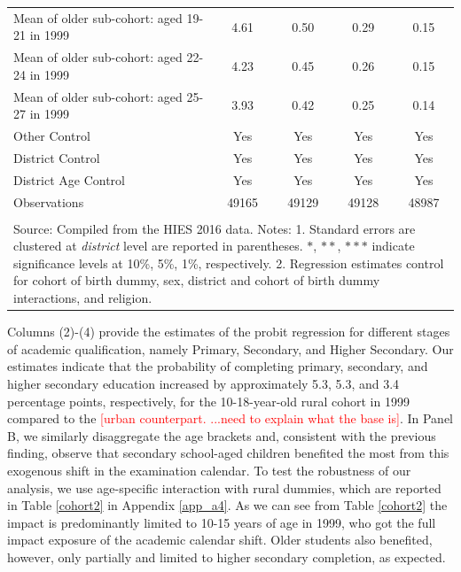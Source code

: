 \documentclass[12pt,letterpaper]{article}
\newcommand{\SAdded}[1]{\textcolor{red}{#1}}
\newcommand{\0}{\ensuremath{\mbox{\boldmath $0$}}}
\begin{document}
\begin{table}[h!]
\begin{center}
{{\begin{tabular}{lcccc}
	Mean of older sub-cohort: aged 19-21 in 1999                  &   4.61           &      0.50     &       0.29        &  0.15                         \\
	Mean of older sub-cohort: aged 22-24 in 1999                  &   4.23           &      0.45     &       0.26        &  0.15                         \\
	Mean of older sub-cohort: aged 25-27 in 1999                  &   3.93           &      0.42     &       0.25        &  0.14                         \\
	Other Control                               &    Yes    &  Yes      &   Yes     &   Yes       \\
	District Control                            &    Yes    &  Yes      &   Yes     &   Yes       \\
	District \times \textnormal{Age Control}                            &    Yes    &  Yes      &   Yes     &   Yes       \\
	Observations                                &       49165         &       49129         &       49128         &       48987         \\
	\hline
	\hline\\
	\multicolumn{5}{p{15cm}}{{\footnotesize Source: Compiled from the HIES 2016 data.
	Notes: 1. Standard errors are clustered at \textit{district} level are reported in parentheses. $*$, $**$, $***$ indicate significance levels at 10\%, 5\%, 1\%, respectively.
	2. Regression estimates control for cohort of birth dummy, sex, district and cohort of birth dummy interactions, and religion.}}.
	\end{tabular}
	}
}
\end{center}
\end{table}


Columns (2)-(4) provide the estimates of the probit regression for different stages of academic qualification, namely Primary, Secondary, and Higher Secondary. Our estimates indicate that the probability of completing primary, secondary, and higher secondary education increased by approximately 5.3, 5.3, and 3.4 percentage points, respectively, for the 10-18-year-old rural cohort in 1999 compared to the \SAdded{[urban counterpart. ...need to explain what the base is]}. In Panel B, we similarly disaggregate the age brackets and, consistent with the previous finding, observe that secondary school-aged children benefited the most from this exogenous shift in the examination calendar. To test the robustness of our analysis, we use age-specific interaction with rural dummies, which are reported in Table \ref{cohort2} in Appendix \ref{app_a4}. As we can see from Table \ref{cohort2} the impact is predominantly limited to 10-15 years of age in 1999, who got the full impact exposure of the academic calendar shift. Older students also benefited, however, only partially and limited to higher secondary completion, as expected. 
\end{document}
